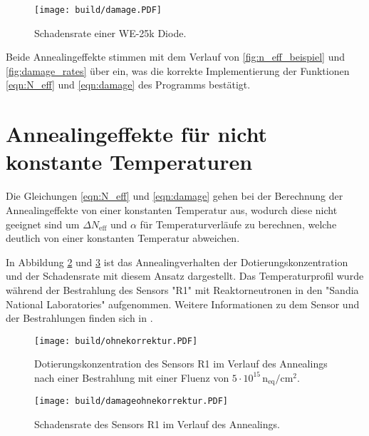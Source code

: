 \begin{figure}
  \centering
    \texttt{[image: build/damage.PDF]}
    \caption{Schadensrate einer WE-25k Diode.}
    \label{fig:damage}
\end{figure}

Beide Annealingeffekte stimmen mit dem Verlauf von \ref{fig:n_eff_beispiel} und \ref{fig:damage_rates} über ein, was
die korrekte Implementierung der Funktionen \ref{eqn:N_eff} und \ref{eqn:damage}  des Programms
bestätigt.



\section{Annealingeffekte für nicht konstante Temperaturen}{\label{nicht_konstant}}
Die Gleichungen \ref{eqn:N_eff} und \ref{eqn:damage} gehen bei der Berechnung der Annealingeffekte von
einer konstanten Temperatur aus, wodurch diese nicht geeignet sind um $\Delta N_{\mathrm{eff}}$ und $\alpha$ für
Temperaturverläufe zu berechnen, welche deutlich von einer konstanten Temperatur abweichen.


In Abbildung \ref{fig:N_eff_ohne} und \ref{fig:damage_ohne} ist das Annealingverhalten
der Dotierungskonzentration und der Schadensrate mit
diesem Ansatz dargestellt.
Das Temperaturprofil wurde während der Bestrahlung
des Sensors "R1" mit Reaktorneutronen in den
"Sandia National Laboratories" aufgenommen.
Weitere Informationen zu dem Sensor und
der Bestrahlungen finden sich in \cite{mareike}.

\begin{figure}
  \centering
    \texttt{[image: build/ohnekorrektur.PDF]}
    \caption{Dotierungskonzentration des Sensors R1 im Verlauf des Annealings nach einer Bestrahlung mit einer Fluenz von
    $5\cdot 10^{15} \, \mathrm{n_{eq}/cm^2}$.}
    \label{fig:N_eff_ohne}
\end{figure}

\begin{figure}
  \centering
    \texttt{[image: build/damageohnekorrektur.PDF]}
    \caption{Schadensrate des Sensors R1 im Verlauf des Annealings.}
    \label{fig:damage_ohne}
\end{figure}

